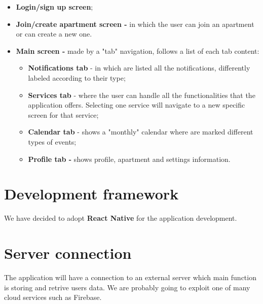 \documentclass[]{article}
\begin{document}
	\begin{itemize}
		\item \textbf{Login/sign up screen};
		\item \textbf{Join/create apartment screen -} in which the user can join an apartment 
		or can create a new one.
		\item \textbf{Main screen -} made by a "tab" navigation, follows a list of each tab content:  
		\begin{itemize}
			\item \textbf{Notifications tab} - in which are listed all the notifications, 
			differently labeled according to their type;
			\item \textbf{Services tab} - where the user can handle all the functionalities that
			the application offers. Selecting one service will navigate to a new specific screen for that service;
			\item \textbf{Calendar tab} - shows a "monthly" calendar where are marked different types of events;
			\item \textbf{Profile tab -} shows profile, apartment and settings information.
		\end{itemize}
			
	\end{itemize}

	\section{Development framework}
	We have decided to adopt \textbf{React Native} for the application development.

	\section{Server connection}
	
	The application will have a connection to an external server which main function is storing and retrive users data. We are probably going to exploit one of many cloud services such as Firebase. 
\end{document}
